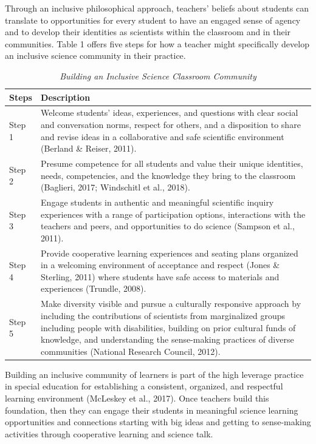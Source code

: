 \documentclass[11.5pt]{sig-alternate}
\begin{document}
\begin{large}
Through an inclusive philosophical approach, teachers’ beliefs about students can translate to opportunities for every student to have an engaged sense of agency and to develop their identities as scientists within the classroom and in their communities. Table 1 offers five steps for how a teacher might specifically develop an inclusive science community in their practice.

\begin{table}[t]
\caption{\textit{Building an Inclusive Science Classroom Community}}
\begin{tabular}{ll}
\hline
Steps & Description \\ \hline
Step 1 & Welcome students’ ideas, experiences, and questions with clear social and conversation norms, respect for others, and a disposition to share and revise ideas in a collaborative and safe scientific environment (Berland \& Reiser, 2011). \\ \hline
Step 2 & Presume competence for all students and value their unique identities, needs, competencies, and the knowledge they bring to the classroom (Baglieri, 2017; Windschitl et al., 2018). \\ \hline
Step 3 & Engage students in authentic and meaningful scientific inquiry experiences with a range of participation options, interactions with the teachers and peers, and opportunities to do science (Sampson et al., 2011). \\ \hline
Step 4 & Provide cooperative learning experiences and seating plans organized in a welcoming environment of acceptance and respect (Jones \& Sterling, 2011) where students have safe access to materials and experiences (Trundle, 2008). \\ \hline
Step 5 & Make diversity visible and pursue a culturally responsive approach by including the contributions of scientists from marginalized groups including people with disabilities, building on prior cultural funds of knowledge, and understanding the sense-making practices of diverse communities (National Research Council, 2012). \\ \hline
\end{tabular}
\end{table}

Building an inclusive community of learners is part of the high leverage practice in special education for establishing a consistent, organized, and respectful learning environment (McLeskey et al., 2017). Once teachers build this foundation, then they can engage their students in meaningful science learning opportunities and connections starting with big ideas and getting to sense-making activities through cooperative learning and science talk. 


\end{large}
\end{document}
